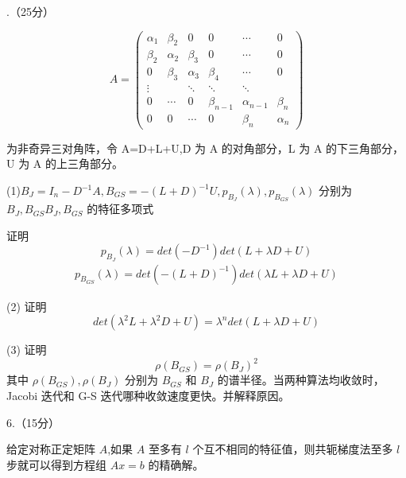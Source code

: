 \documentclass{article}
\begin{document}
.（25分）

$$A=\begin{pmatrix}\alpha_1&\beta_2&0&0&\cdots&0\\\beta_2&\alpha_2&\beta_3&0&\cdots&0\\0&\beta_3&\alpha_3&\beta_4&\cdots&0\\\vdots&&\ddots&\ddots&\ddots&\\0&\cdots&0&\beta_{n-1}&\alpha_{n-1}&\beta_n\\0&0&\cdots&0&\beta_n&\alpha_n\end{pmatrix}$$


为非奇异三对角阵，令 A=D+L+U,D 为 A 的对角部分，L 为 A 的下三角部分，U 为 A 的上三角部分。

(1)$B_J=I_n-D^{-1}A,B_{GS}=-(L+D)^{-1}U,p_{B_J}(\lambda),p_{B_{GS}}(\lambda)$ 分别为 $B_J,B_{GS}B_J,B_{GS}$ 的特征多项式

证明 
$$p_{B_J}(\lambda)=det(-D^{-1})det(L+\lambda D+U)$$ $$\begin{aligned}p_{B_{GS}}(\lambda)=det(-(L+D)^{-1})det(\lambda L+\lambda D+U)\end{aligned}$$

(2) 证明 $$det(\lambda^2L+\lambda^2D+U)=\lambda^ndet(L+\lambda D+U)$$

(3) 证明 $$\rho(B_{GS})=\rho(B_J)^2$$ 其中 $\rho(B_{GS}),\rho(B_J)$ 分别为 $B_{GS}$ 和 $B_J$ 的谱半径。当两种算法均收敛时，Jacobi 迭代和 G-S 迭代哪种收敛速度更快。并解释原因。

6.（15分）

 给定对称正定矩阵 $A$,如果 $A$ 至多有 $l$ 个互不相同的特征值，则共轭梯度法至多 $l$ 步就可以得到方程组 $Ax=b$ 的精确解。
\end{document}
